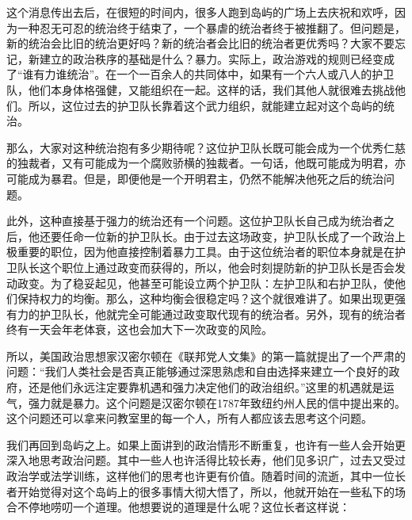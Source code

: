 这个消息传出去后，在很短的时间内，很多人跑到岛屿的广场上去庆祝和欢呼，因为一种忍无可忍的统治终于结束了，一个暴虐的统治者终于被推翻了。但问题是，新的统治会比旧的统治更好吗？新的统治者会比旧的统治者更优秀吗？大家不要忘记，新建立的政治秩序的基础是什么？暴力。实际上，政治游戏的规则已经变成了“谁有力谁统治”。在一个一百余人的共同体中，如果有一个六人或八人的护卫队，他们本身体格强健，又能组织在一起。这样的话，我们其他人就很难去挑战他们。所以，这位过去的护卫队长靠着这个武力组织，就能建立起对这个岛屿的统治。

那么，大家对这种统治抱有多少期待呢？这位护卫队长既可能会成为一个优秀仁慈的独裁者，又有可能成为一个腐败骄横的独裁者。一句话，他既可能成为明君，亦可能成为暴君。但是，即便他是一个开明君主，仍然不能解决他死之后的统治问题。

此外，这种直接基于强力的统治还有一个问题。这位护卫队长自己成为统治者之后，他还要任命一位新的护卫队长。由于过去这场政变，护卫队长成了一个政治上极重要的职位，因为他直接控制着暴力工具。由于这位统治者的职位本身就是在护卫队长这个职位上通过政变而获得的，所以，他会时刻提防新的护卫队长是否会发动政变。为了稳妥起见，他甚至可能设立两个护卫队：左护卫队和右护卫队，使他们保持权力的均衡。那么，这种均衡会很稳定吗？这个就很难讲了。如果出现更强有力的护卫队长，他就完全可能通过政变取代现有的统治者。另外，现有的统治者终有一天会年老体衰，这也会加大下一次政变的风险。

所以，美国政治思想家汉密尔顿在《联邦党人文集》的第一篇就提出了一个严肃的问题：“我们人类社会是否真正能够通过深思熟虑和自由选择来建立一个良好的政府，还是他们永远注定要靠机遇和强力决定他们的政治组织。”这里的机遇就是运气，强力就是暴力。这个问题是汉密尔顿在1787年致纽约州人民的信中提出来的。这个问题还可以拿来问教室里的每一个人，所有人都应该去思考这个问题。

我们再回到岛屿之上。如果上面讲到的政治情形不断重复，也许有一些人会开始更深入地思考政治问题。其中一些人也许活得比较长寿，他们见多识广，过去又受过政治学或法学训练，这样他们的思考也许更有价值。随着时间的流逝，其中一位长者开始觉得对这个岛屿上的很多事情大彻大悟了，所以，他就开始在一些私下的场合不停地唠叨一个道理。他想要说的道理是什么呢？这位长者这样说：



